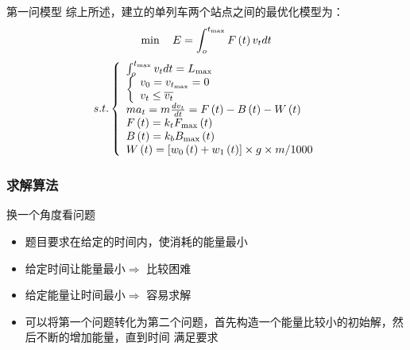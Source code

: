 \documentclass{beamer}
\begin{document}
\begin{frame}{第一问模型}
 综上所述，建立的单列车两个站点之间的最优化模型为：
\[\min {\kern 1pt} {\kern 1pt} {\kern 1pt} {\kern 1pt} {\kern 1pt} {\kern 1pt} {\kern 1pt} {\kern 1pt} {\kern 1pt} {\kern 1pt} E = \int_o^{{t_{\max }}} {F\left( t \right){v_t}dt} \]
\[s.t.\left\{ \begin{array}{l}
 \int_o^{{t_{\max }}} {{v_t}dt}  = {L_{\max }} \\
 \left\{ \begin{array}{l}
 {v_0} = {v_{{t_{\max }}}} = 0 \\
 {v_t} \le \overline {{v_t}}  \\
 \end{array} \right. \\
 m{a_t} = m\frac{{d{v_t}}}{{dt}} = F\left( t \right) - B\left( t \right) - W\left( t \right) \\
 F\left( t \right) = {k_t}{F_{\max }}\left( t \right) \\
 B\left( t \right) = {k_b}{B_{\max }}\left( t \right) \\
 W\left( t \right) = \left[ {{w_0}\left( t \right) + {w_1}\left( t \right)} \right] \times g \times {m \mathord{\left/
 {\vphantom {m {1000}}} \right.
 \kern-\nulldelimiterspace} {1000}} \\
 \end{array} \right.\]

\end{frame}

\subsubsection{求解算法}
\begin{frame}{换一个角度看问题}

\begin{itemize}
  \item<1-> 题目要求在给定的时间内，使消耗的能量最小
  \item<2-> 给定时间让能量最小$\Longrightarrow$ 比较困难
  \item<3-> 给定能量让时间最小$\Longrightarrow$ 容易求解
  \item<4-> 可以将第一个问题转化为第二个问题，首先构造一个能量比较小的初始解，然后不断的增加能量，直到时间
  满足要求
\end{itemize}
\end{frame}
\end{document}
